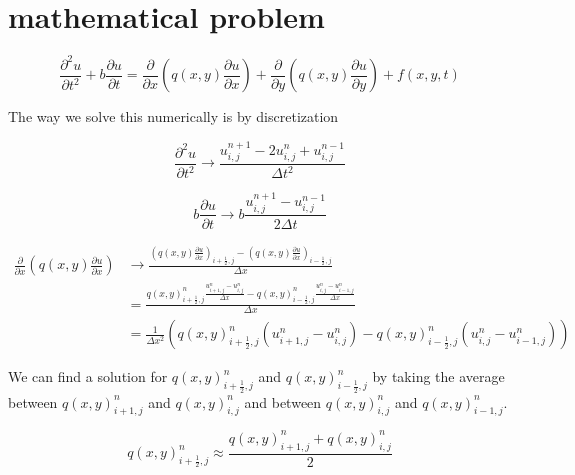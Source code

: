 \section{mathematical problem}

\begin{equation}
 \frac{\partial^2 u}{\partial t^2} + b\frac{\partial u}{\partial t} = \frac{\partial}{\partial x} \left( q(x,y)\frac{\partial u}{\partial x} \right)
 + \frac{\partial}{\partial y} \left( q(x,y)\frac{\partial u}{\partial y} \right) + f(x,y,t)
 \label{wave_eq}
\end{equation}

The way we solve this numerically is by discretization 

\begin{equation}
 \frac{\partial^2 u}{\partial t^2} \rightarrow \frac{u^{n+1}_{i,j} - 2u^{n}_{i,j} + u^{n-1}_{i,j}}{\Delta t^2}
\end{equation}

\begin{equation}
 b\frac{\partial u}{\partial t} \rightarrow b\frac{u^{n+1}_{i,j} - u^{n-1}_{i,j}}{2\Delta t}
\end{equation}

\begin{align}
  \frac{\partial}{\partial x} \left( q(x,y)\frac{\partial u}{\partial x} \right)  \nonumber
  &\rightarrow \frac{\left( q(x,y)\frac{\partial u}{\partial x} \right)_{i+\frac{1}{2},j} - \left( q(x,y)\frac{\partial u}{\partial x} \right)_{i-\frac{1}{2},j}}{\Delta x} \nonumber \\
  & = \frac{q(x,y)_{i + \frac{1}{2},j}^n \frac{u_{i+1,j}^n - u_{i,j}^n}{\Delta x} - q(x,y)_{i - \frac{1}{2},j}^n \frac{u_{i,j}^n - u_{i-1,j}^n}{\Delta x}}{\Delta x} \nonumber \\
  & = \frac{1}{\Delta x^2} \left( q(x,y)_{i + \frac{1}{2},j}^n \left( u_{i+1,j}^n - u_{i,j}^n \right) - q(x,y)_{i - \frac{1}{2},j}^n \left( u_{i,j}^n - u_{i-1,j}^n \right) \right)
\end{align}

We can find a solution for $q(x,y)_{i + \frac{1}{2},j}^n$ and $q(x,y)_{i - \frac{1}{2},j}^n$ by taking the average between 
$q(x,y)_{i + 1,j}^n$ and $q(x,y)_{i,j}^n$ and between $q(x,y)_{i,j}^n$ and $q(x,y)_{i - 1,j}^n$.

\begin{subequations}
\begin{equation}
  q(x,y)_{i + \frac{1}{2},j}^n \approx \frac{q(x,y)_{i + 1,j}^n + q(x,y)_{i,j}^n}{2}
\end{equation}
\end{subequations}

